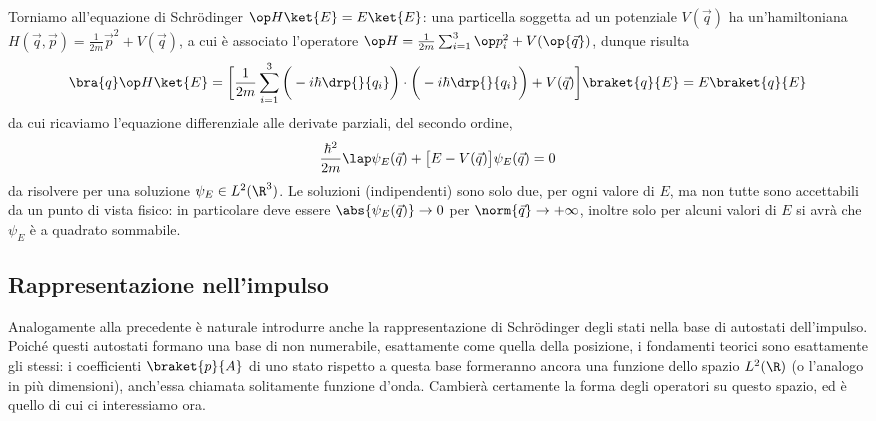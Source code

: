 Torniamo all'equazione di Schr\"odinger $\op H\ket{E}=E\ket{E}$: una particella soggetta ad un potenziale $V(\vec q)$ ha un'hamiltoniana $H(\vec q,\vec p)=\frac1{2m}\vec p^2+V(\vec q)$, a cui è associato l'operatore $\op H=\frac1{2m}\sum_{i=1}^3\op p_i^2+V(\op{\vec q})$, dunque risulta
\begin{equation}
	\bra{q}\op H\ket{E}=\bigg[\frac1{2m}\sum_{i=1}^3\bigg(-i\hbar\drp{}{q_i}\bigg)\cdot\bigg(-i\hbar\drp{}{q_i}\bigg)+V(\vec q)\bigg]\braket{q}{E}=E\braket{q}{E}
	\label{eq:hamiltoniano-coordinate}
\end{equation}
da cui ricaviamo l'equazione differenziale alle derivate parziali, del secondo ordine,
\begin{equation}
	\frac{\hbar^2}{2m}\lap\psi_E(\vec q)+\big[E-V(\vec q)\big]\psi_E(\vec q)=0
	\label{eq:schroedinger}
\end{equation}
da risolvere per una soluzione $\psi_E\in L^2(\R^3)$.
Le soluzioni (indipendenti) sono solo due, per ogni valore di $E$, ma non tutte sono accettabili da un punto di vista fisico: in particolare deve essere $\abs{\psi_E(\vec q)}\to 0$ per $\norm{\vec q}\to+\infty$, inoltre solo per alcuni valori di $E$ si avrà che $\psi_E$ è a quadrato sommabile.

\subsection{Rappresentazione nell'impulso}
Analogamente alla precedente è naturale introdurre anche la rappresentazione di Schr\"odinger degli stati nella base di autostati dell'impulso.
Poich\'e questi autostati formano una base di non numerabile, esattamente come quella della posizione, i fondamenti teorici sono esattamente gli stessi: i coefficienti $\braket{p}{A}$ di uno stato rispetto a questa base formeranno ancora una funzione dello spazio $L^2(\R)$ (o l'analogo in più dimensioni), anch'essa chiamata solitamente funzione d'onda.
Cambierà certamente la forma degli operatori su questo spazio, ed è quello di cui ci interessiamo ora.

